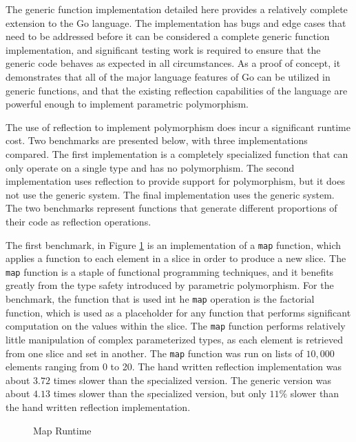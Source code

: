 \documentclass[letterpaper,twocolumn,11pt]{article}
\begin{document}
The generic function implementation detailed here provides a relatively complete extension to the Go language. The implementation has bugs and edge cases that need to be addressed before it can be considered a complete generic function implementation, and significant testing work is required to ensure that the generic code behaves as expected in all circumstances. As a proof of concept, it demonstrates that all of the major language features of Go can be utilized in generic functions, and that the existing reflection capabilities of the language are powerful enough to implement parametric polymorphism.

The use of reflection to implement polymorphism does incur a significant runtime cost. Two benchmarks are presented below, with three implementations compared. The first implementation is a completely specialized function that can only operate on a single type and has no polymorphism. The second implementation uses reflection to provide support for polymorphism, but it does not use the generic system. The final implementation uses the generic system. The two benchmarks represent functions that generate different proportions of their code as reflection operations. 

The first benchmark, in Figure \ref{fig:map} is an implementation of a \texttt{map} function, which applies a function to each element in a slice in order to produce a new slice. The \texttt{map} function is a staple of functional programming techniques, and it benefits greatly from the type safety introduced by parametric polymorphism. For the benchmark, the function that is used int he \texttt{map} operation is the factorial function, which is used as a placeholder for any function that performs significant computation on the values within the slice. The \texttt{map} function performs relatively little manipulation of complex parameterized types, as each element is retrieved from one slice and set in another. The \texttt{map} function was run on lists of $10,000$ elements ranging from 0 to 20. The hand written reflection implementation was about $3.72$ times slower than the specialized version. The generic version was about $4.13$ times slower than the specialized version, but only $11\%$ slower than the hand written reflection implementation.

\begin{figure}
    \caption{Map Runtime\label{fig:map}}
    \centering
    
\end{figure}
\end{document}
